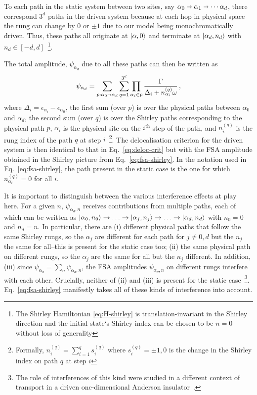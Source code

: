 \documentclass[aps,prl,twocolumn,superscriptaddress,nobalancelastpage,longbibliography]{revtex4-2}
\newcommand\eq[1]{\begin{align}#1\end{align}}
\begin{document}
To each path in the static system between two sites, say $\alpha_0\shortrightarrow\alpha_1\shortrightarrow\cdots\alpha_d$, there correspond $3^d$ paths in the driven system because at each hop in physical space the rung can change by $0$ or $\pm 1$ due to our model being monochromatically driven. Thus, these paths all originate at $\ket{\alpha,0}$ and terminate at $\ket{\alpha_d,n_d}$ with $n_d\in\left[-d,d\right]$~\footnote{The Shirley Hamiltonian \eqref{eq:H-shirley} is translation-invariant in the Shirley direction and the initial state`s Shirley index can be chosen to be $n=0$ without loss of generality}.

The total amplitude, $\psi_{\alpha_d}$ due to all these paths can then be written as
\eq{
\psi_{\alpha_d}=\sum_{p:\alpha_0\shortrightarrow\alpha_d}\sum_{q=1}^{3^d}\prod_{\alpha_i\in p}\frac{\Gamma}{\Delta_i+n_{\alpha_i}^{(q)}\omega}\,,
\label{eq:fsa-shirley}
}
where $\Delta_i=\epsilon_{\alpha_i}-\epsilon_{\alpha_0}$, the first sum (over $p$) is over the physical paths between $\alpha_0$ and $\alpha_d$, the second sum (over $q$) is over the Shirley paths corresponding to the physical path $p$, $\alpha_i$ is the physical site on the $i^\mathrm{th}$ step of the path, and $n_i^{(q)}$ is the rung index of the path $q$ at step $i$~\footnote{Formally, $n_i^{(q)}=\sum_{i=1}^q s_i^{(q)}$ where $s_i^{(q)}=\pm1,0$ is the change in the Shirley index on path $q$ at step $i$}.
The delocalisation criterion for the driven system is then identical to that in Eq.~\ref{eq:deloc-crit} but with the FSA amplitude obtained in the Shirley picture from Eq.~\ref{eq:fsa-shirley}. In the notation used in Eq.~\ref{eq:fsa-shirley}, the path present in the static case is the one for which $n_{\alpha_i}^{(q)}=0$ for all $i$. 





It is important to distinguish between the various interference effects at play here.  For a given $n$, $\psi_{\alpha_d,n}$ receives contributions from multiple paths, each of which can be written as $\ket{\alpha_0,n_0}\rightarrow\ldots\rightarrow \ket{\alpha_j,n_j}\rightarrow\ldots\rightarrow\ket{\alpha_d,n_d}$ with $n_0=0$ and $n_d=n$. In particular, there are  (i) different physical paths that follow the same Shirley rungs, so the $\alpha_j$ are different for each path for $j\neq 0,d$ but the $n_j$ the same for all--this is present for the static case too; (ii) the same physical path on different rungs, so the $\alpha_j$ are the same for all but the $n_j$ different.
In addition, (iii)  since $\psi_{\alpha_d}=\sum_n\psi_{\alpha_d,n}$, the FSA amplitudes $\psi_{\alpha_d,n}$ on different rungs interfere with each other. 
Crucially, neither of (ii) and (iii) is present for the static case~\footnote{The role of interferences of this kind were studied in a different context of transport in a driven one-dimensional Anderson insulator~\cite{localisation2017agarwal}.}.
Eq.~\ref{eq:fsa-shirley} manifestly takes all of these kinds of interference into account.
\end{document}

